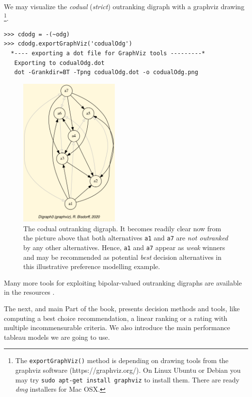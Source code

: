 We may visualize the \emph{codual} ({\em strict\/}) outranking digraph with a graphviz drawing \footnote{The \texttt{exportGraphViz()} method is depending on drawing tools from the graphviz software (https://graphviz.org/). On Linux Ubuntu or Debian you may try \texttt{sudo apt-get install graphviz} to install them. There are ready \emph{dmg} installers for Mac OSX.}.
\begin{lstlisting}
>>> cdodg = -(~odg)
>>> cdodg.exportGraphViz('codualOdg')
  *---- exporting a dot file for GraphViz tools ---------*
   Exporting to codualOdg.dot
   dot -Grankdir=BT -Tpng codualOdg.dot -o codualOdg.png
\end{lstlisting}
\begin{figure}[h]
\sidecaption[t]
\includegraphics[width=5cm]{Figures/codualOdg.png}
\caption{The codual outranking digraph. It becomes readily clear now from the picture above that both alternatives \texttt{a1}  and \texttt{a7} are {\em not outranked\/} by any other alternatives. Hence, \texttt{a1}  and \texttt{a7} appear as \emph{weak} \Condorcet winners and may be recommended as potential \emph{best} decision alternatives in this illustrative preference modelling example.}
\label{fig:3.1}       %
\end{figure}
 
Many more tools for exploiting bipolar-valued outranking digraphs are available in the \Digraph resources \citep{BIS-2021}.
\vspace{1cm}

The next, and main Part of the book, presents decision methods and tools, like computing a best choice recommendation, a linear ranking or a rating with multiple incommensurable criteria. We also introduce the main performance tableau models we are going to use.  

{}

